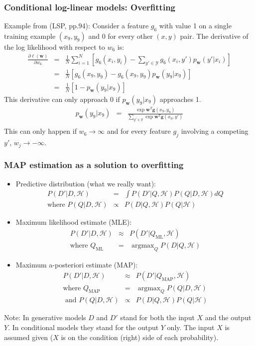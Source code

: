 \documentclass[ignorenonframetext,plain]{beamer}
\DeclareMathOperator*{\argmax}{argmax}
\renewcommand{\vec}{\mathbf}
\begin{document}
\begin{frame}\frametitle{Conditional log-linear models: Overfitting}
Example from (LSP, pp.94): Consider a feature $g_6$ with value 1 on a
single training example $(x_9, y_9)$ and 0 for every other $(x, y)$
pair.  The derivative of the log likelihood with respect to $w_6$
is: \begin{eqnarray*} \frac{\partial \ell(\vec{w})}{\partial w_6}
  &=& \frac{1}{N} \sum_{i=1}^N \left[ g_6(x_i, y_i) -
    \sum_{y'\in\mathcal{Y}} g_6(x_i, y') p_\vec{w}(y'|x_i) \right]
  \\ &=& \frac{1}{N} \left[g_6(x_9, y_9) - g_6(x_9, y_9)
    p_\vec{w}(y_9|x_9)\right] \\ &=& \frac{1}{N} \left[ 1 -
    p_\vec{w}(y_9|x_9) \right]
\end{eqnarray*}
This derivative can only approach 0 if $p_\vec{w}(y_9|x_9)$
approaches 1.\begin{eqnarray*}
p_\vec{w}(y_9|x_9) &=& \frac{\exp \vec{w}^T \vec{g}(x_9,y_9)}
{\sum_{y'\in\mathcal{Y}} \exp \vec{w}^T \vec{g}(x_9,y')} \\
\end{eqnarray*}
This can only happen if $w_6\rightarrow\infty$ and for every feature
$g_j$ involving a competing $y'$, $w_j\rightarrow-\infty$.
\end{frame}

\begin{frame}\frametitle{MAP estimation as a solution to overfitting}
\begin{itemize}
\item Predictive distribution (what we really want):\begin{eqnarray*}
  P(D'|D,\mathcal{H}) &=& \int P(D'|Q,\mathcal{H}) P(Q|D,\mathcal{H}) dQ \\
  \text{where } P(Q|D,\mathcal{H}) &\propto& P(D|Q,\mathcal{H}) P(Q|\mathcal{H})
\end{eqnarray*}
\item Maximum likelihood estimate (MLE):\begin{eqnarray*}
  P(D'|D,\mathcal{H}) &\approx& P(D'|Q_\text{ML}, \mathcal{H}) \\
\mbox{where } Q_\text{ML} &=& \argmax_Q P(D|Q,\mathcal{H})
\end{eqnarray*}
\item Maximum a-posteriori estimate (MAP):\begin{eqnarray*}
  P(D'|D,\mathcal{H}) &\approx& P(D'|Q_\text{MAP}, \mathcal{H}) \\
\mbox{where } Q_\text{MAP} &=& \argmax_Q P(Q|D,\mathcal{H}) \\
\mbox{ and } P(Q|D,\mathcal{H}) &\propto& P(D|Q,\mathcal{H}) P(Q|\mathcal{H})
\end{eqnarray*}
\end{itemize}
\footnotesize Note: In generative models $D$ and $D'$ stand for both
the input $X$ and the output $Y$.  In conditional models they stand
for the output $Y$ only.  The input $X$ is assumed given ($X$ is on
the condition (right) side of each probability).
\end{frame}
\end{document}
